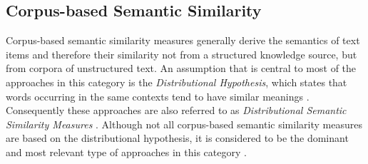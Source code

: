 \documentclass[11pt]{scrreprt}
\let\cite\parencite  %
\begin{document}
\subsection{Corpus-based Semantic Similarity}
\label{sec:corpus-based-semantic-similarity}
Corpus-based semantic similarity measures generally derive the semantics of text items and therefore their similarity not from a structured knowledge source, but from corpora of unstructured text. An assumption that is central to most of the approaches in this category is the \textit{Distributional Hypothesis}, which states that words occurring in the same contexts tend to have similar meanings \cite{harrisDistributionalStructure1954}. Consequently these approaches are also referred to as \textit{Distributional Semantic Similarity Measures} \cite{mohammadDistributionalMeasuresSemantic2012}. Although not all corpus-based semantic similarity measures are based on the distributional hypothesis, it is considered to be the dominant and most relevant type of approaches in this category \cite[Section 2.4]{harispeSemanticSimilarityNatural2015}.
\end{document}
